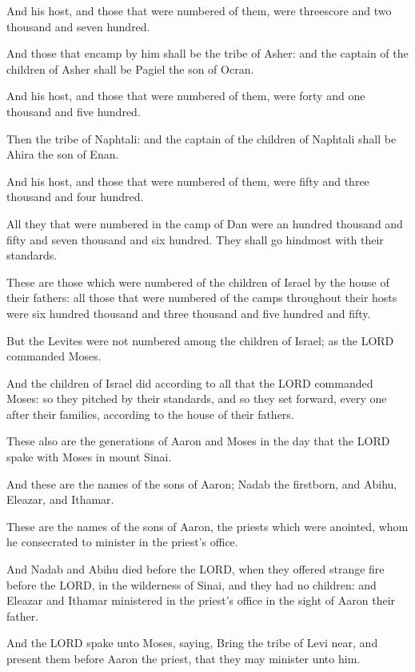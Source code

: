 \Verse And his host, and those that were numbered of them, were
threescore and two thousand and seven hundred.

\Verse And those that encamp by him shall be the tribe of Asher: and the
captain of the children of Asher shall be Pagiel the son of Ocran.

\Verse And his host, and those that were numbered of them, were forty
and one thousand and five hundred.

\Verse Then the tribe of Naphtali: and the captain of the children of
Naphtali shall be Ahira the son of Enan.

\Verse And his host, and those that were numbered of them, were fifty
and three thousand and four hundred.

\Verse All they that were numbered in the camp of Dan were an hundred
thousand and fifty and seven thousand and six hundred. They shall go
hindmost with their standards.

\Verse These are those which were numbered of the children of Israel by
the house of their fathers: all those that were numbered of the camps
throughout their hosts were six hundred thousand and three thousand
and five hundred and fifty.

\Verse But the Levites were not numbered among the children of Israel;
as the LORD commanded Moses.

\Verse And the children of Israel did according to all that the LORD
commanded Moses: so they pitched by their standards, and so they set
forward, every one after their families, according to the house of
their fathers.


\Chapter
\Verse These also are the generations of Aaron and Moses in the day that
the LORD spake with Moses in mount Sinai.

\Verse And these are the names of the sons of Aaron; Nadab the firstborn,
and Abihu, Eleazar, and Ithamar.

\Verse These are the names of the sons of Aaron, the priests which were
anointed, whom he consecrated to minister in the priest's office.

\Verse And Nadab and Abihu died before the LORD, when they offered
strange fire before the LORD, in the wilderness of Sinai, and they had
no children: and Eleazar and Ithamar ministered in the priest's office
in the sight of Aaron their father.

\Verse And the LORD spake unto Moses, saying, \Verse Bring the tribe of Levi
near, and present them before Aaron the priest, that they may minister
unto him.

